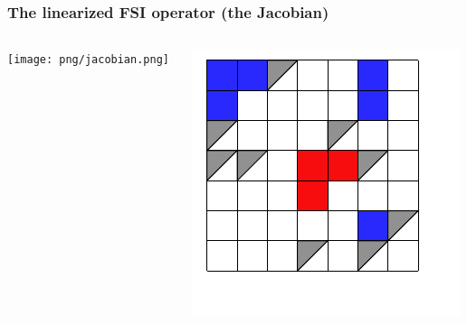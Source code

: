 \begin{frame}
  \frametitle{The linearized FSI operator (the Jacobian)}

  \begin{columns}

    \begin{column}{0.5\textwidth}
      \texttt{[image: png/jacobian.png]}
    \end{column}

    \begin{column}{0.5\textwidth}
      \includegraphics[width=\textwidth]{pdf/jacobian.pdf}
    \end{column}

  \end{columns}

\end{frame}
